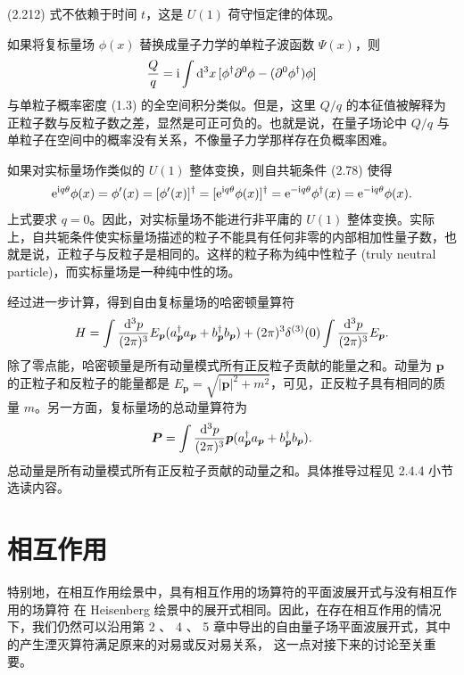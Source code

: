 (2.212) 式不依赖于时间 $t$，这是 $U(1)$ 荷守恒定律的体现。

如果将复标量场 $\phi(x)$ 替换成量子力学的单粒子波函数 $\Psi(x)$，则
\begin{equation}
  \frac{Q}{q}
  = \mathrm{i}\int\dd^3x\,[\phi^\dagger\partial^0\phi-(\partial^0\phi^\dagger)\phi]
\end{equation}
与单粒子概率密度 (1.3) 的全空间积分类似。但是，这里 $Q/q$ 的本征值被解释为正粒子数与反粒子数之差，显然是可正可负的。也就是说，在量子场论中 $Q/q$ 与单粒子在空间中的概率没有关系，不像量子力学那样存在负概率困难。

如果对实标量场作类似的 $U(1)$ 整体变换，则自共轭条件 (2.78) 使得
\begin{equation}
  \mathrm{e}^{\mathrm{i} q\theta}\phi(x)
  = \phi'(x)
  = [\phi'(x)]^\dagger
  = [\mathrm{e}^{\mathrm{i} q\theta}\phi(x)]^\dagger
  = \mathrm{e}^{-\mathrm{i} q\theta}\phi^\dagger(x)
  = \mathrm{e}^{-\mathrm{i} q\theta}\phi(x).
\end{equation}
上式要求 $q=0$。因此，对实标量场不能进行非平庸的 $U(1)$ 整体变换。实际上，自共轭条件使实标量场描述的粒子不能具有任何非零的内部相加性量子数，也就是说，正粒子与反粒子是相同的。这样的粒子称为纯中性粒子 (truly neutral particle)，而实标量场是一种纯中性的场。

经过进一步计算，得到自由复标量场的哈密顿量算符
\begin{equation}
  H
  = \int\frac{\dd^3p}{(2\pi)^3}E_{\bm{p}}
    (a^\dagger_{\bm{p}}a_{\bm{p}}+b^\dagger_{\bm{p}}b_{\bm{p}})
    +(2\pi)^3\delta^{(3)}(0)\int\frac{\dd^3p}{(2\pi)^3}E_{\bm{p}}.
\end{equation}
除了零点能，哈密顿量是所有动量模式所有正反粒子贡献的能量之和。动量为 $\bm{p}$ 的正粒子和反粒子的能量都是 $E_{\bm{p}}=\sqrt{|\bm{p}|^2+m^2}$，可见，正反粒子具有相同的质量 $m$。另一方面，复标量场的总动量算符为
\begin{equation}
  \bm{P}
  = \int\frac{\dd^3p}{(2\pi)^3}
    \bm{p}(a^\dagger_{\bm{p}}a_{\bm{p}}+b^\dagger_{\bm{p}}b_{\bm{p}}).
\end{equation}
总动量是所有动量模式所有正反粒子贡献的动量之和。具体推导过程见 2.4.4 小节选读内容。

\section{相互作用}


特别地，在相互作用绘景中，具有相互作用的场算符的平面波展开式与没有相互作用的场算符
在 Heisenberg 绘景中的展开式相同。因此，在存在相互作用的情况下，我们仍然可以沿用第 2 、
4 、 5 章中导出的自由量子场平面波展开式，其中的产生湮灭算符满足原来的对易或反对易关系，
这一点对接下来的讨论至关重要。

